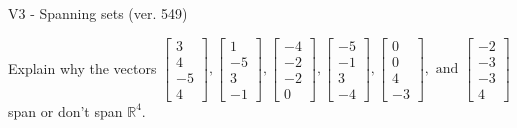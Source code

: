 \begin{exercise}
  \begin{exerciseTitle}V3 - Spanning sets (ver. 549)\end{exerciseTitle}
  \begin{exerciseStatement}
    Explain why the vectors \(\left[\begin{array}{r}
3 \\
4 \\
-5 \\
4
\end{array}\right] , \left[\begin{array}{r}
1 \\
-5 \\
3 \\
-1
\end{array}\right] , \left[\begin{array}{r}
-4 \\
-2 \\
-2 \\
0
\end{array}\right] , \left[\begin{array}{r}
-5 \\
-1 \\
3 \\
-4
\end{array}\right] , \left[\begin{array}{r}
0 \\
0 \\
4 \\
-3
\end{array}\right] , \text{ and } \left[\begin{array}{r}
-2 \\
-3 \\
-3 \\
4
\end{array}\right]\) span or don't span \(\mathbb{R}^4\). 
	



\end{exerciseStatement}
\end{exercise}

